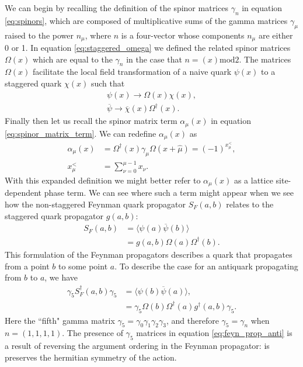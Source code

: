 We can begin by recalling the definition of the spinor matrices $\gamma_n$ in equation \ref{eq:spinors}, which are composed of multiplicative sums of the gamma matrices $\gamma_\mu$ raised to the power $n_\mu$, where $n$ is a four-vector whose components $n_\mu$ are either 0 or 1. In equation \ref{eq:staggered_omega} we defined the related spinor matrices $\Omega(x)$ which are equal to the $\gamma_n$ in the case that $n=(x)\mathrm{mod}2$.  The matrices $\Omega(x)$ facilitate the local field transformation of a naive quark $\psi(x)$ to a staggered quark $\chi(x)$ such that 
\begin{equation}
    \begin{split}
        \psi(x) \rightarrow \Omega(x)\chi(x),\\
        \overline{\psi} \rightarrow \overline{\chi}(x)\Omega^\dagger(x).
    \end{split}
\end{equation}
Finally then let us recall the spinor matrix term $\alpha_\mu(x)$ in equation \ref{eq:spinor_matrix_term}. We can redefine $\alpha_\mu(x)$ as
\label{eq:general_phase_term}
\begin{align}
     \alpha_\mu(x) &= \Omega^\dagger(x)\gamma_\mu \Omega(x+\hat{\mu})=(-1)^{x_\mu^<},\\
           x_\mu^< &= \sum_{\nu = 0}^{\mu-1}x_\nu.
\end{align}
With this expanded definition we might better refer to $\alpha_\mu(x)$ as a lattice site-dependent phase term.  We can see where such a term might appear when we see how the non-staggered Feynman quark propagator $S_F(a,b)$ relates to the staggered quark propagator $g(a,b)$:
\begin{equation}\label{eq:feyn_prop}
\begin{split}
    S_F(a,b) &= \langle \psi(a)\overline\psi(b)\rangle\\
             &= g(a,b)\Omega(a)\Omega^\dagger(b).
\end{split}
\end{equation}
This formulation of the Feynman propagators describes a quark that propagates from a point $b$ to some point $a$. To describe the case for an antiquark propagating from $b$ to $a$, we have
\begin{equation}\label{eq:feyn_prop_anti}
\begin{split}
       \gamma_5 S^\dagger_F(a,b)\gamma_5 &= \langle \psi(b)\overline\psi(a)\rangle,\\
       &= \gamma_5 \Omega(b)\Omega^\dagger(a)g^\dagger(a,b) \gamma_5.
\end{split}
\end{equation}
Here the ``fifth" gamma matrix $\gamma_5 = \gamma_0\gamma_1\gamma_2\gamma_3$, and therefore $\gamma_5 = \gamma_n$ when $n=(1,1,1,1)$.  The presence of $\gamma_5$ matrices in equation \ref{eq:feyn_prop_anti} is a result of reversing the argument ordering in the Feynman propagator: is preserves the hermitian symmetry of the action.

